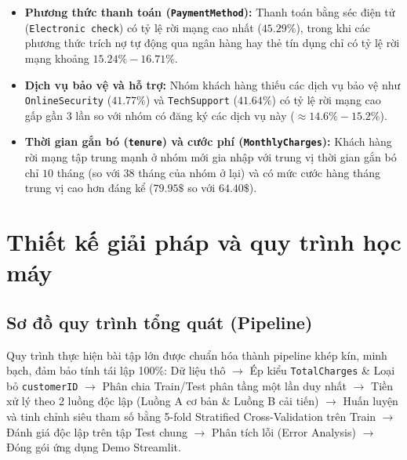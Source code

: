 \documentclass[12pt,a4paper]{article}
\begin{document}
\begin{enumerate}
\begin{itemize}
        \item \textbf{Phương thức thanh toán (\texttt{PaymentMethod}):} Thanh toán bằng séc điện tử (\texttt{Electronic check}) có tỷ lệ rời mạng cao nhất ($45.29\%$), trong khi các phương thức trích nợ tự động qua ngân hàng hay thẻ tín dụng chỉ có tỷ lệ rời mạng khoảng $15.24\% - 16.71\%$.
        \item \textbf{Dịch vụ bảo vệ và hỗ trợ:} Nhóm khách hàng thiếu các dịch vụ bảo vệ như \texttt{OnlineSecurity} ($41.77\%$) và \texttt{TechSupport} ($41.64\%$) có tỷ lệ rời mạng cao gấp gần 3 lần so với nhóm có đăng ký các dịch vụ này ($\approx 14.6\% - 15.2\%$).
        \item \textbf{Thời gian gắn bó (\texttt{tenure}) và cước phí (\texttt{MonthlyCharges}):} Khách hàng rời mạng tập trung mạnh ở nhóm mới gia nhập với trung vị thời gian gắn bó chỉ $10$ tháng (so với $38$ tháng của nhóm ở lại) và có mức cước hàng tháng trung vị cao hơn đáng kể ($79.95\$$ so với $64.40\$$).
    \end{itemize}
\end{enumerate}

\section{Thiết kế giải pháp và quy trình học máy}

\subsection{Sơ đồ quy trình tổng quát (Pipeline)}
Quy trình thực hiện bài tập lớn được chuẩn hóa thành pipeline khép kín, minh bạch, đảm bảo tính tái lập 100\%:
Dữ liệu thô $\rightarrow$ Ép kiểu \texttt{TotalCharges} \& Loại bỏ \texttt{customerID} $\rightarrow$ Phân chia Train/Test phân tầng một lần duy nhất $\rightarrow$ Tiền xử lý theo 2 luồng độc lập (Luồng A cơ bản \& Luồng B cải tiến) $\rightarrow$ Huấn luyện và tinh chỉnh siêu tham số bằng 5-fold Stratified Cross-Validation trên Train $\rightarrow$ Đánh giá độc lập trên tập Test chung $\rightarrow$ Phân tích lỗi (Error Analysis) $\rightarrow$ Đóng gói ứng dụng Demo Streamlit.
\end{document}
